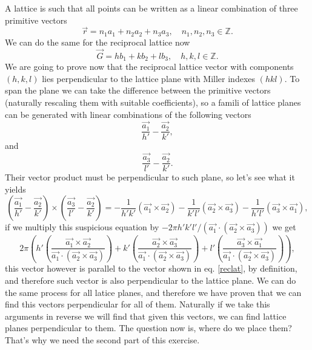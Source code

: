 \begin{questions}
\begin{solution}
  A lattice is such that all points can be written as a linear combination of three primitive vectors
  \begin{equation}
    \vec{r} = n_1a_1 + n_2a_2 + n_3a_3, \quad n_1,n_2,n_3\in\mathbb{Z}.
  \end{equation}
  We can do the same for the reciprocal lattice now
  \begin{equation}
    \vec{G} = hb_1 + kb_2 + lb_3, \quad h,k,l\in\mathbb{Z}.
    \label{reclat}
  \end{equation}
  We are going to prove now that the reciprocal lattice vector with components $(h,k,l)$ lies perpendicular to the lattice plane with Miller indexes $(hkl)$. To span the plane we can take the difference between the primitive vectors (naturally rescaling them with suitable coefficients), so a famili of lattice planes can be generated with linear combinations of the following vectors
  \begin{equation}
    \frac{\vec{a_1}}{h'} - \frac{\vec{a_2}}{k'},
  \end{equation}
  and
  \begin{equation}
    \frac{\vec{a_3}}{l'} - \frac{\vec{a_2}}{k'}.
  \end{equation}
  Their vector product must be perpendicular to such plane, so let's see what it yields
  \begin{equation}
    \left(\frac{\vec{a_1}}{h'} - \frac{\vec{a_2}}{k'}\right)\times \left(\frac{\vec{a_3}}{l'} - \frac{\vec{a_2}}{k'}\right) = - \frac{1}{h'k'}(\vec{a_1}\times \vec{a_2}) - \frac{1}{k'l'}(\vec{a_2}\times \vec{a_3}) - \frac{1}{h'l'}(\vec{a_3}\times \vec{a_1}),
  \end{equation}
  if we multiply this suspicious equation by $-2\pi h'k'l'/(\vec{a_1}\cdot(\vec{a_2}\times \vec{a_3}))$ we get
  \begin{equation}
    2\pi\left( h'\left(\frac{\vec{a_1}\times \vec{a_2}}{\vec{a_1}\cdot(\vec{a_2}\times \vec{a_3})}\right) + k'\left(\frac{\vec{a_2}\times \vec{a_3}}{\vec{a_1}\cdot(\vec{a_2}\times \vec{a_3})}\right) + l'\left(\frac{\vec{a_3}\times \vec{a_1}}{\vec{a_1}\cdot(\vec{a_2}\times \vec{a_3})}\right)\right),
  \end{equation}
  this vector however is parallel to the vector shown in eq. \ref{reclat}, by definition, and therefore such vector is also perpendicular to the lattice plane. We can do the same process for all latice planes, and therefore we have proven that we can find this vectors perpendicular for all of them. Naturally if we take this arguments in reverse we will find that given this vectors, we can find lattice planes perpendicular to them. The question now is, where do we place them? That's why we need the second part of this exercise.


\end{solution}
\end{questions}
